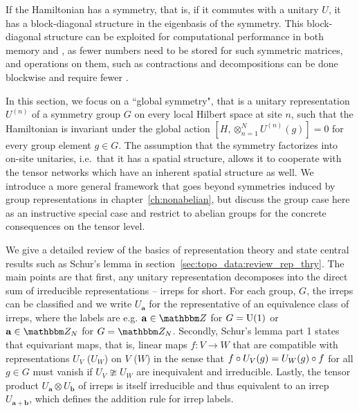 If the Hamiltonian has a symmetry, that is, if it commutes with a unitary $U$, it has a block-diagonal structure in the eigenbasis of the symmetry.
%
This block-diagonal structure can be exploited for computational performance in both memory and , as fewer numbers need to be stored for such symmetric matrices, and operations on them, such as contractions and decompositions can be done blockwise and require fewer .

In this section, we focus on a ``global symmetry", that is a unitary representation $U^{(n)}$ of a symmetry group $G$ on every local Hilbert space at site $n$, such that the Hamiltonian is invariant under the global action $[ H, \otimes_{n=1}^{N} U^{(n)}(g)] = 0$ for every group element $g \in G$.
%
The assumption that the symmetry factorizes into on-site unitaries, i.e.~that it has a spatial structure, allows it to cooperate with the tensor networks which have an inherent spatial structure as well.
%
We introduce a more general framework that goes beyond symmetries induced by group representations in chapter~\ref{ch:nonabelian}, but discuss the group case here as an instructive special case and restrict to abelian groups for the concrete consequences on the tensor level.


We give a detailed review of the basics of representation theory and state central results such as Schur's lemma in section~\ref{sec:topo_data:review_rep_thry}.
%
The main points are that first, any unitary representation decomposes into the direct sum of irreducible representations -- irreps for short.
%
For each group, $G$, the irreps can be classified and we write $U_\mathbf{a}$ for the representative of an equivalence class of irreps, where the labels are e.g. $\mathbf{a}\in\Zbb$ for $G=\mathrm{U}(1)$ or $\mathbf{a}\in\Zbb_N$ for $G=\Zbb_N$.
%
Secondly, Schur's lemma part 1 states that equivariant maps, that is, linear maps $f: V \to W$ that are compatible with representations $U_V$ ($U_W$) on $V$ ($W$) in the sense that $f \circ U_V(g) = U_W(g) \circ f$ for all $g \in G$ must vanish if $U_V \ncong U_W$ are inequivalent and irreducible.
%
Lastly, the tensor product $U_\mathbf{a} \otimes U_\mathbf{b}$ of irreps is itself irreducible and thus equivalent to an irrep $U_\mathbf{a + b}$, which defines the addition rule for irrep labels.



